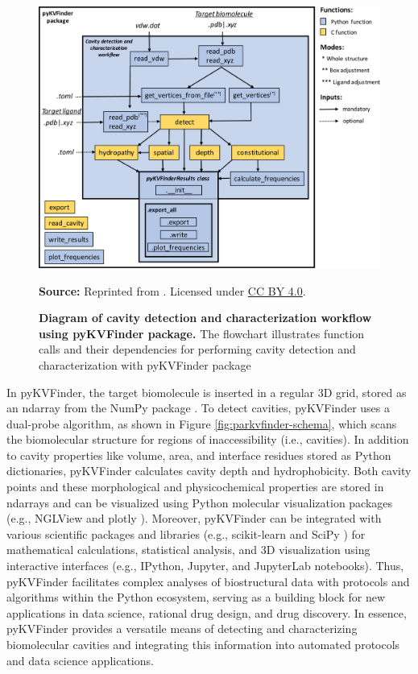\documentclass[Ingles]{phdthesis}
\def\ie{i.e.\onedot}
\def\eg{e.g.\onedot}
\begin{document}
\begin{figure}[h]
  \centering
  \includegraphics[scale=0.7]{images/code-workflow.png}
  \centerline{\tiny{\textbf{Source:} Reprinted from \cite{guerra2021}. Licensed under \href{https://creativecommons.org/licenses/by/4.0/}{CC BY 4.0}.}}
  \caption[Diagram of cavity detection and characterization workflow using pyKVFinder package]{\textbf{Diagram of cavity detection and characterization workflow using pyKVFinder package.}  The flowchart illustrates function calls and their dependencies for performing cavity detection and characterization with pyKVFinder package}
  \label{fig:code-workflow}
\end{figure}

In pyKVFinder, the target biomolecule is inserted in a regular 3D grid, stored as an \ac{ndarray} from the NumPy package \cite{numpy}. To detect cavities, pyKVFinder uses a dual-probe algorithm, as shown in Figure \ref{fig:parkvfinder-schema}, which scans the biomolecular structure for regions of inaccessibility (\ie, cavities). In addition to cavity properties like volume, area, and interface residues stored as Python dictionaries, pyKVFinder calculates cavity depth and hydrophobicity. Both cavity points and these morphological and physicochemical properties are stored in \acsp{ndarray} and can be visualized using Python molecular visualization packages (\eg, NGLView \cite{nglview} and plotly \cite{plotly}). Moreover, pyKVFinder can be integrated with various scientific packages and libraries (\eg, scikit-learn \cite{scikit-learn} and SciPy \cite{scipy}) for mathematical calculations, statistical analysis, and \acs{3D} visualization using interactive interfaces (\eg, IPython, Jupyter, and JupyterLab notebooks). Thus, pyKVFinder facilitates complex analyses of biostructural data with protocols and algorithms within the Python ecosystem, serving as a building block for new applications in data science, rational drug design, and drug discovery. In essence, pyKVFinder provides a versatile means of detecting and characterizing biomolecular cavities and integrating this information into automated protocols and data science applications.
\end{document}
